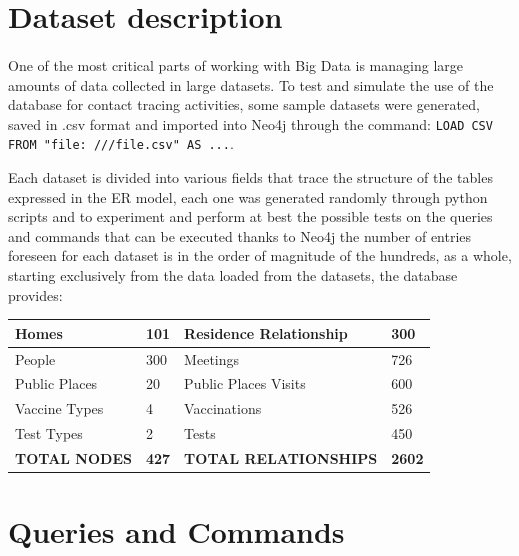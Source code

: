 \documentclass[a4paper,12pt]{article}
\begin{document}
\section{Dataset description}
\paragraph{} One of the most critical parts of working with Big Data is managing large amounts of data collected in large datasets. To test and simulate the use of the database for contact tracing activities, some sample datasets were generated, saved in .csv format and imported into Neo4j through the command: \texttt{LOAD CSV FROM "file: ///file.csv" AS ...}. \par
Each dataset is divided into various fields that trace the structure of the tables expressed in the ER model, each one was generated randomly through python scripts and to experiment and perform at best the possible tests on the queries and commands that can be executed thanks to Neo4j the number of entries foreseen for each dataset is in the order of magnitude of the hundreds, as a whole, starting exclusively from the data loaded from the datasets, the database provides:
\begin{center}
\begin{tabular}{|l|l|l|l|}
\hline
Homes & 101 & Residence Relationship & 300 \\
\hline
People & 300 & Meetings & 726 \\
\hline
Public Places & 20 & Public Places Visits & 600 \\
\hline
Vaccine Types & 4 & Vaccinations & 526 \\
\hline
Test Types & 2 & Tests & 450\\
\hline
\textbf{TOTAL NODES} & \textbf{427} & \textbf{TOTAL RELATIONSHIPS} & \textbf{2602}\\
\hline
\end{tabular}
\end{center}

\section{Queries and Commands}
\end{document}
